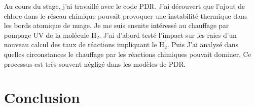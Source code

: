 \documentclass[11pt,a4paper]{article}
\begin{document}
\begin{spacing}{0.98}
Au cours du stage, j'ai travaillé avec le code PDR. J'ai découvert que l'ajout de chlore dans le réseau chimique pouvait provoquer une instabilité thermique dans les bords atomique de nuage. Je me suis ensuite intéressé au chauffage par pompage UV de la molécule $\mathrm{H}_2$. J'ai d'abord testé l'impact sur les raies d'un nouveau calcul des taux de réactions impliquant le $\mathrm{H}_2$. Puis J'ai analysé dans quelles circonstances le chauffage par les réactions chimiques pouvait dominer. Ce processus est très souvent négligé dans les modèles de PDR. 








\clearpage

\clearpage


\section*{Conclusion}

\clearpage



\clearpage





\end{spacing}
\end{document}
